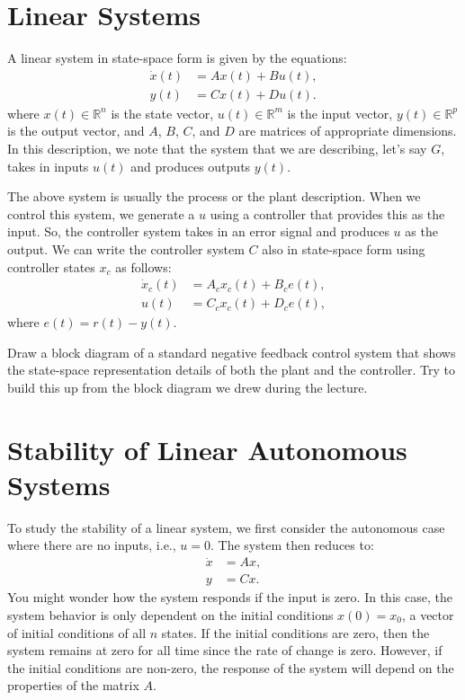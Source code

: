 \documentclass{ee122_notes}
\begin{document}
\section{Linear Systems}
A linear system in state-space form is given by the equations:
\begin{align*}
    \dot{x}(t) &= Ax(t) + Bu(t), \\
    y(t) &= Cx(t) + Du(t).
\end{align*}
where $x(t) \in \mathbb{R}^n$ is the state vector, $u(t) \in \mathbb{R}^m$ is the input vector, $y(t) \in \mathbb{R}^p$ is the output vector, and $A$, $B$, $C$, and $D$ are matrices of appropriate dimensions. In this description, we note that the system that we are describing, let's say $G$, takes in inputs $u(t)$ and produces outputs $y(t)$. 

The above system is usually the process or the plant description. When we control this system, we generate a $u$ using a controller that provides this as the input. So, the controller system takes in an error signal and produces $u$ as the output. We can write the controller system $C$ also in state-space form using controller states $x_c$ as follows:
\begin{align*}
    \dot{x}_c(t) &= A_c x_c(t) + B_c e(t), \\
    u(t) &= C_c x_c(t) + D_c e(t),
\end{align*}
where $e(t) = r(t) - y(t)$.

\begin{popquiz}
    Draw a block diagram of a standard negative feedback control system that shows the state-space representation details of both the plant and the controller.
    \popqsplit
    Try to build this up from the block diagram we drew during the lecture.
\end{popquiz}

\section{Stability of Linear Autonomous Systems}
To study the stability of a linear system, we first consider the autonomous case where there are no inputs, i.e., $u = 0$. The system then reduces to:
\begin{align*}
    \dot{x} &= Ax, \\
    y &= Cx.
\end{align*}
You might wonder how the system responds if the input is zero. In this case, the system behavior is only dependent on the initial conditions $x(0) = x_0$, a vector of initial conditions of all $n$ states. If the initial conditions are zero, then the system remains at zero for all time since the rate of change is zero. However, if the initial conditions are non-zero, the response of the system will depend on the properties of the matrix $A$.
\end{document}
